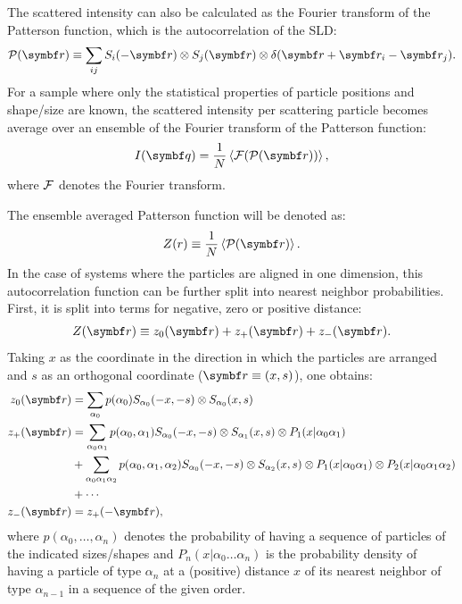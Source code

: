 The scattered intensity can also be calculated as the Fourier transform of the Patterson function, which is the autocorrelation of the SLD:
\begin{equation*}
  \curlp (\r ) \equiv \sum_{ij} S_i(-\r )\otimes S_j(\r )\otimes \delta (\r + \r_i - \r_j ).
\end{equation*}
For a sample where only the statistical properties of particle positions and shape/size are known, the scattered intensity per scattering particle becomes average over an ensemble of the Fourier transform of the Patterson function:
\begin{equation*}
  I(\q ) = \frac{1}{N}\bra\curlf (\curlp (\r ))\ket,
\end{equation*}
where $\mathcal{F}$ denotes the Fourier transform.

The ensemble averaged Patterson function will be denoted as:
\begin{equation*}
  Z(r) \equiv \frac{1}{N}\bra\curlp (\r )\ket.
\end{equation*}
In the case of systems where the particles are aligned in one dimension, this autocorrelation function can be further split into nearest neighbor probabilities. First, it is split into terms for negative, zero or positive distance:
\begin{equation*}
  Z(\r ) \equiv z_0(\r ) + z_+(\r ) + z_-(\r ).
\end{equation*}
Taking $x$ as the coordinate in the direction in which the particles are arranged and $s$ as an orthogonal coordinate ($\r \equiv (x,s)$), one obtains:
\begin{align*}
  z_0(\r ) &= \sum_{\alpha_0} p(\alpha_0) S_{\alpha_0}(-x,-s) \otimes S_{\alpha_0}(x,s)  \\
  z_+(\r ) &= \sum_{\alpha_0\alpha_1} p(\alpha_0,\alpha_1) S_{\alpha_0}(-x,-s) \otimes S_{\alpha_1}(x,s) \otimes P_1(x|\alpha_0\alpha_1)  \\
               &+ \sum_{\alpha_0\alpha_1\alpha_2} p(\alpha_0,\alpha_1,\alpha_2) S_{\alpha_0}(-x,-s) \otimes S_{\alpha_2}(x,s) \otimes P_1(x|\alpha_0\alpha_1) \otimes P_2(x|\alpha_0\alpha_1\alpha_2)  \\
               &+ \dotsb \\
  z_-(\r ) &= z_+(-\r ),
\end{align*}
where $p(\alpha_0,\dotsc ,\alpha_n)$ denotes the probability of having a sequence of particles of the indicated sizes/shapes and $P_n(x|\alpha_0\dotsc\alpha_n)$ is the probability density of having a particle of type $\alpha_n$ at a (positive) distance $x$ of its nearest neighbor of type $\alpha_{n-1}$ in a sequence of the given order.

